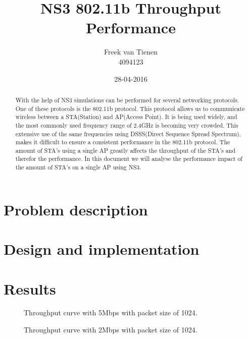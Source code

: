 \documentclass[]{article}
\begin{document}


\title{NS3 802.11b Throughput Performance}
\author{Freek van Tienen \\ 4094123}
\date{28-04-2016}
\maketitle

\begin{abstract}
With the help of NS3 simulations can be performed for several networking protocols.
One of these protocols is the 802.11b protocol.
This protocol allows us to communicate wireless between a STA(Station) and AP(Access Point).
It is being used widely, and the most commonly used frequency range of 2.4GHz is becoming very crowded.
This extensive use of the same frequencies using DSSS(Direct Sequence Spread Spectrum), makes it difficult to ensure a consistent performance in the 802.11b protocol.
The amount of STA's using a single AP greatly affects the throughput of the STA's and therefor the performance.
In this document we will analyse the performance impact of the amount of STA's on a single AP using NS3.
\end{abstract}


\section{Problem description}

\section{Design and implementation}

\section{Results}

\begin{figure}
    
   \caption{Throughput curve with 5Mbps with packet size of 1024.\label{fig:tp_5}}
\end{figure}

\begin{figure}
    
   \caption{Throughput curve with 2Mbps with packet size of 1024.\label{fig:tp_2}}
\end{figure}
\end{document}
